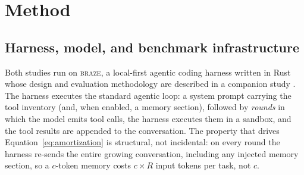 \documentclass[smallcondensed,natbib]{svjour3}
\newcommand{\braze}{\textsc{braze}}
\begin{document}
\section{Method}\label{sec:method}

\subsection{Harness, model, and benchmark
infrastructure}\label{sec:method-harness}

Both studies run on \braze{}, a local-first agentic coding harness
written in Rust whose design and evaluation methodology are described
in a companion study \citep{parra2026scaffolding}. The harness executes the
standard agentic loop: a system prompt carrying the tool inventory
(and, when enabled, a memory section), followed by \emph{rounds} in
which the model emits tool calls, the harness executes them in a
sandbox, and the tool results are appended to the conversation. The
property that drives Equation~\eqref{eq:amortization} is structural,
not incidental: on every round the harness re-sends the entire growing
conversation, including any injected memory section, so a
$c$-token memory costs $c \times R$ input tokens per task, not $c$.
\end{document}
